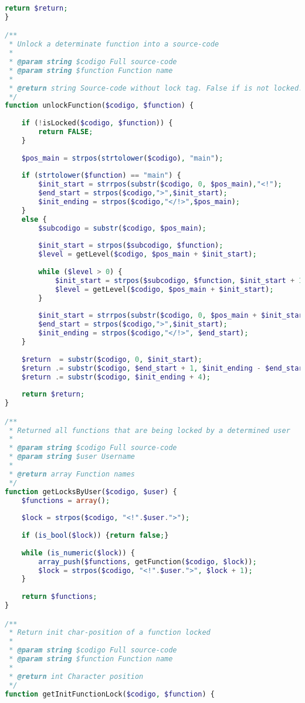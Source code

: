 \begin{lstlisting}[language=PHP]
	return $return;
}

/**
 * Unlock a determinate function into a source-code
 * 
 * @param string $codigo Full source-code
 * @param string $function Function name
 * 
 * @return string Source-code without lock tag. False if is not locked.
 */
function unlockFunction($codigo, $function) {
	
	if (!isLocked($codigo, $function)) {
		return FALSE;
	}
	
	$pos_main = strpos(strtolower($codigo), "main");
	
	if (strtolower($function) == "main") {
		$init_start = strrpos(substr($codigo, 0, $pos_main),"<!");
		$end_start = strpos($codigo,">",$init_start);
		$init_ending = strpos($codigo,"</!>",$pos_main);
	}
	else {
		$subcodigo = substr($codigo, $pos_main);
		
		$init_start = strpos($subcodigo, $function);
		$level = getLevel($codigo, $pos_main + $init_start);
		
		while ($level > 0) {
			$init_start = strpos($subcodigo, $function, $init_start + 1);
			$level = getLevel($codigo, $pos_main + $init_start);
		}
		
		$init_start = strrpos(substr($codigo, 0, $pos_main + $init_start), "<!");
		$end_start = strpos($codigo,">",$init_start);
		$init_ending = strpos($codigo,"</!>", $end_start);
	}
	
	$return  = substr($codigo, 0, $init_start);
	$return .= substr($codigo, $end_start + 1, $init_ending - $end_start - 1);
	$return .= substr($codigo, $init_ending + 4);
	
	return $return;
}

/**
 * Returned all functions that are being locked by a determined user
 * 
 * @param string $codigo Full source-code
 * @param string $user Username
 * 
 * @return array Function names
 */
function getLocksByUser($codigo, $user) {
	$functions = array();
	
	$lock = strpos($codigo, "<!".$user.">");
	
	if (is_bool($lock)) {return false;}
	
	while (is_numeric($lock)) {
		array_push($functions, getFunction($codigo, $lock));
		$lock = strpos($codigo, "<!".$user.">", $lock + 1);
	}
	
	return $functions;
}

/**
 * Return init char-position of a function locked
 * 
 * @param string $codigo Full source-code
 * @param string $function Function name
 * 
 * @return int Character position
 */
function getInitFunctionLock($codigo, $function) {
		

\end{lstlisting}
